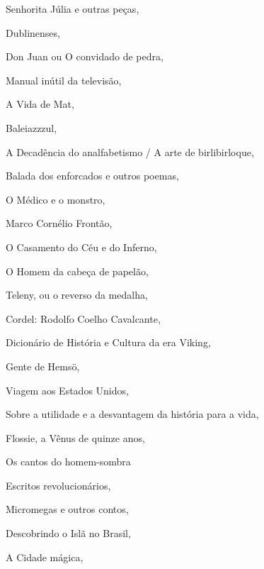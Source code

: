 \begin{multicols}{2}
\begin{enumerate}
{\item Senhorita Júlia e outras peças, {}
\item Dublinenses, {}
\item Don Juan ou O convidado de pedra, {}
\item Manual inútil da televisão, {}
\item A Vida de Mat, {}
\item Baleiazzzul, {}
\item A Decadência do analfabetismo / A arte de birlibirloque, {}
\item Balada dos enforcados e outros poemas, {}
\item O Médico e o monstro, {}
\item Marco Cornélio Frontão, {}
\item O Casamento do Céu e do Inferno, {}
\item O Homem da cabeça de papelão, {}
\item Teleny, ou o reverso da medalha, {}
\item Cordel: Rodolfo Coelho Cavalcante, {}
\item Dicionário de História e Cultura da era Viking, {}
\item Gente de Hemsö, {}
\item Viagem aos Estados Unidos, {}
\item Sobre a utilidade e a desvantagem da história para a vida, {}
\item Flossie, a Vênus de quinze anos, {}
\item Os cantos do homem-sombra
\item Escritos revolucionários, {}
\item Micromegas e outros contos, {}
\item Descobrindo o Islã no Brasil, {}
\item A Cidade mágica, {}
}
\end{enumerate}
\end{multicols}
